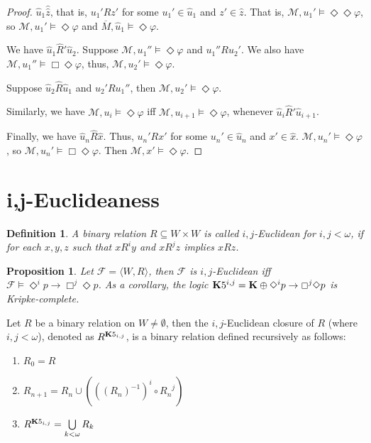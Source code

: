 \documentclass[a4paper]{article}
\theoremstyle{defin}
\newtheorem{defin}{Definition}
\theoremstyle{theorem}
\theoremstyle{prop}
\newtheorem{prop}{Proposition}
\theoremstyle{lemma}
\theoremstyle{fact}
\theoremstyle{exercise}
\theoremstyle{ex}
\theoremstyle{col}
\theoremstyle{claim}
\begin{document}
\begin{proof}
  \vspace{\baselineskip}

  $\hat{u}_1 \widehat \hat{z}$, that is, $u_1' R z'$ for some $u_1' \in \hat{u}_1$ and $z' \in \hat{z}$.
  That is, $\mathcal{M}, u_1' \models \Diamond \Diamond \varphi$, so $\mathcal{M}, u_1' \models \Diamond \varphi$ and $\overline{M}, \hat{u}_1 \models \Diamond \varphi$.

  We have $\hat{u}_1 \widehat{R}' \hat{u}_2$. Suppose $\mathcal{M}, u_1'' \models \Diamond \varphi$ and $u_1'' R u_2'$.
  We also have $\mathcal{M}, u_1'' \models \Box \Diamond \varphi$, thus, $\mathcal{M}, u_2' \models \Diamond \varphi$.

  Suppose $\hat{u}_2 \widehat{R} \hat{u}_1$ and $u_2' R u_1''$, then $\mathcal{M}, u_2' \models \Diamond \varphi$.

  Similarly, we have $\mathcal{M}, u_i \models \Diamond \varphi$ iff $\mathcal{M}, u_{i + 1} \models \Diamond \varphi$, whenever $\hat{u}_i \widehat{R}' \hat{u}_{i + 1}$.

  Finally, we have $\hat{u}_n \widehat{R} \hat{x}$. Thus, $u_n' R x'$ for some $u_n' \in \hat{u}_n$ and $x' \in \hat{x}$. $\mathcal{M}, u_n' \models \Diamond \varphi$, so $\mathcal{M}, u_n' \models \Box \Diamond \varphi$. Then $\mathcal{M}, x' \models \Diamond \varphi$.
\end{proof}

\section{i,j-Euclideaness}

\begin{defin}
A binary relation $R \subseteq W \times W$ is called $i,j$-Euclidean for $i, j < \omega$, if for each $x, y, z$ such that $x R^{i} y$ and $x R^{j} z$ implies $x R z$.
\end{defin}

\begin{prop}
  Let $\mathcal{F} = \langle W, R \rangle$, then $\mathcal{F}$ is $i,j$-Euclidean iff $\mathcal{F} \models \Diamond^i p \to \Box^j \Diamond p$. As a corollary, the logic ${\bf K}5^{i,j} = {\bf K} \oplus \Diamond^i p \to \Box^j \Diamond p$ is Kripke-complete.
\end{prop}

Let $R$ be a binary relation on $W \neq \emptyset$, then the $i,j$-Euclidean closure of $R$ (where $i, j < \omega$), denoted as $R^{{\bf K}5_{i,j}}$, is a binary relation defined recursively as follows:
\begin{enumerate}
  \item $R_0 = R$
  \item $R_{n + 1} = R_n \cup (((R_n)^{-1})^i \circ {R_n}^j)$
  \item $R^{{\bf K}5_{i,j}} = \bigcup \limits_{k < \omega} R_k$
\end{enumerate}
\end{document}
